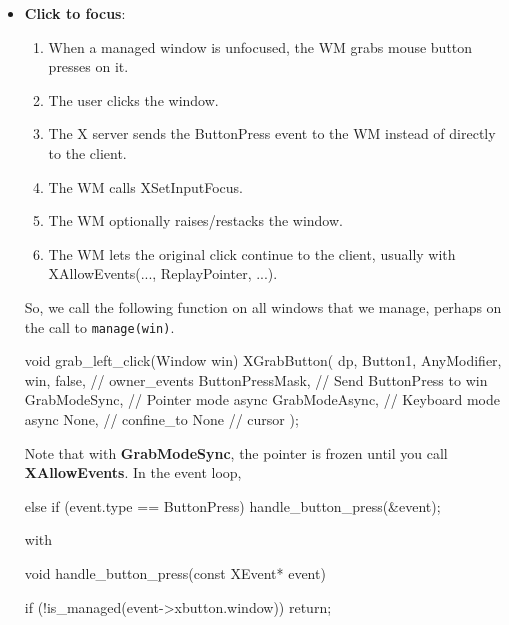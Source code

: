 \documentclass{report}
\begin{document}
\begin{itemize}
\begin{cppcode}
{{                        if (event.type == EnterNotify) {
                            XCrossingEvent enter_event = event.xcrossing;
                            Window event_window = enter_event.window;
                            Time event_time = enter_event.time;

                            give_window_focus(event_window, event_time);
                        }
                    }
                }
            \end{cppcode}
            \bigbreak \noindent 
            Note that \texttt{EnterNotify} must be selected on the windows that we want to focus.
        \item \textbf{Click to focus}: 
            \begin{enumerate}
                \item When a managed window is unfocused, the WM grabs mouse button presses on it.
                \item The user clicks the window.
                \item The X server sends the ButtonPress event to the WM instead of directly to the client.
                \item The WM calls XSetInputFocus.
                \item The WM optionally raises/restacks the window.
                \item The WM lets the original click continue to the client, usually with XAllowEvents(..., ReplayPointer, ...).
            \end{enumerate}
            So, we call the following function on all windows that we manage, perhaps on the call to \texttt{manage(win)}.
            \bigbreak \noindent 
            \begin{cppcode}
                void grab_left_click(Window win) {
                    XGrabButton(
                        dp,
                        Button1,
                        AnyModifier,
                        win,
                        false, // owner_events
                        ButtonPressMask, // Send ButtonPress to win
                        GrabModeSync, // Pointer mode async
                        GrabModeAsync, // Keyboard mode async
                        None, // confine_to
                        None // cursor
                    );
                }
            \end{cppcode}
            \bigbreak \noindent 
            Note that with \textbf{GrabModeSync}, the pointer is frozen until you call \textbf{XAllowEvents}.
            \bigbreak \noindent 
            In the event loop, 
            \bigbreak \noindent 
            \begin{cppcode}
                else if (event.type == ButtonPress) {
                    handle_button_press(&event); 
                }
            \end{cppcode}
            \bigbreak \noindent 
            with
            \bigbreak \noindent 
            \begin{cppcode}
                void handle_button_press(const XEvent* event) {
                    if (!is_managed(event->xbutton.window)) return;

}
\end{cppcode}
\end{itemize}
\end{document}
